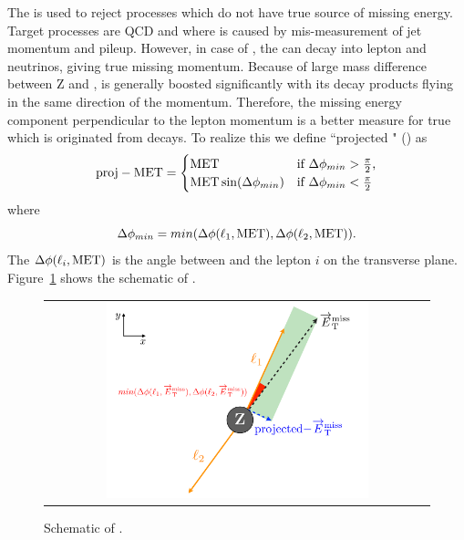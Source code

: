 The \met{} is used to reject processes which do not have true source of missing energy. 
Target processes are QCD and \dyll{} where \met{} is caused by  
mis-measurement of jet momentum and pileup. However, in case of \dytt{}, the \Tau{} can 
decay into lepton and neutrinos, giving true missing momentum. Because of large 
mass difference between Z and \Tau{}, \Tau{} is generally boosted significantly 
with its decay products flying in the same direction of the \Tau momentum. 
Therefore, the missing energy component perpendicular to the lepton momentum 
is a better measure for true \met{} which is originated from \Tau{} decays. 
To realize this we define ``projected \met " (\pmet) as 
\begin{equation}
\mathrm{proj-MET} 
= 
\begin{cases} \mathrm{MET} & \text{if $\Delta\phi_{min}>\frac{\pi}{2}$,}
\\
\mathrm{MET}\sin(\Delta\phi_{min}) & \text{if $\Delta\phi_{min}<\frac{\pi}{2}$}
\end{cases}
\end{equation}
where  
\begin{equation}
\Delta\phi_{min} =  min(\Delta\phi(\ell_1,\mathrm{MET}),\Delta\phi(\ell_2,\mathrm{MET})).
\end{equation}
The $\Delta\phi(\ell_i,\mathrm{MET})$ is the angle between \met{} and the lepton $i$ 
on the transverse plane. Figure~\ref{fig:projmetscheme} shows the schematic 
of \pmet. 
\begin{figure}[htp] 
\centering 
\begin{tabular}{c} 
\includegraphics[width=0.7\textwidth]{figures/projmet.pdf} 
\end{tabular} 
\caption{Schematic of \pmet.}
\label{fig:projmetscheme} 
\end{figure}  
%
